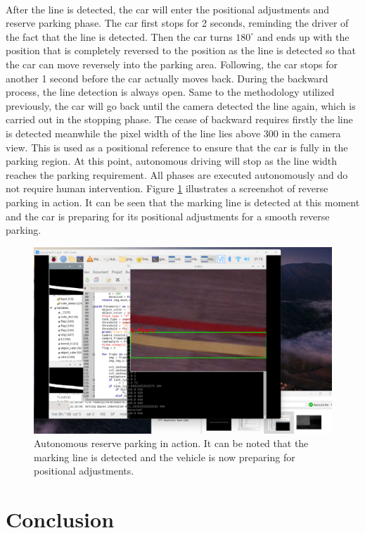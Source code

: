 \documentclass[acmsmall]{acmart}
\begin{document}
\\After the line is detected, the car will enter the positional adjustments and reserve parking phase. The car first stops for 2 seconds, reminding the driver of the fact that the line is detected. Then the car turns $180^\circ$ and ends up with the position that is completely reversed to the position as the line is detected so that the car can move reversely into the parking area. Following, the car stops for another 1 second before the car actually moves back. During the backward process, the line detection is always open. Same to the methodology utilized previously, the car will go back until the camera detected the line again, which is carried out in the stopping phase. The cease of backward requires firstly the line is detected meanwhile the pixel width of the line lies above 300 in the camera view. This is used as a positional reference to ensure that the car is fully in the parking region. At this point, autonomous driving will stop as the line width reaches the parking requirement. All phases are executed autonomously and do not require human intervention. Figure \ref{fig:ato} illustrates a screenshot of reverse parking in action. It can be seen that the marking line is detected at this moment and the car is preparing for its positional adjustments for a smooth reverse parking.

\begin{figure}[!ht]
    \centering
    \includegraphics[width=13cm]{./action.png}
    \caption{Autonomous reserve parking in action. It can be noted that the marking line is detected and the vehicle is now preparing for positional adjustments.}
    \label{fig:ato}
\end{figure}

\section{Conclusion}
\end{document}
